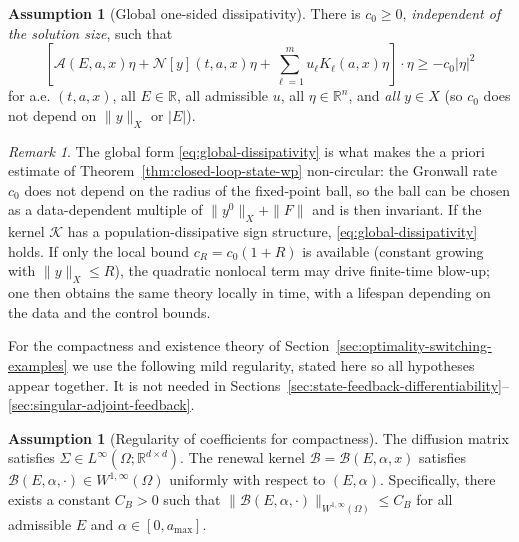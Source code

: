 \documentclass[pdflatex,sn-mathphys-num]{sn-jnl}
\theoremstyle{plain}
\theoremstyle{definition}
\newtheorem{assumption}[theorem]{Assumption}
\theoremstyle{remark}
\newtheorem{remark}[theorem]{Remark}
\newcommand{\R}{\mathbb R}
\begin{document}
\begin{assumption}[Global one-sided dissipativity]
\label{ass:dissipativity}
There is $c_0\ge0$, \emph{independent of the solution size}, such that
\begin{equation}
\label{eq:global-dissipativity}
\left[
\mathcal A(E,a,x)\eta
+
\mathcal N[y](t,a,x)\eta
+
\sum_{\ell=1}^m u_\ell K_\ell(a,x)\eta
\right]\cdot\eta
\ge
-c_0|\eta|^2
\end{equation}
for a.e. $(t,a,x)$, all $E\in\R$, all admissible $u$, all $\eta\in\R^n$, and
\emph{all} $y\in X$ (so $c_0$ does not depend on $\|y\|_X$ or $|E|$).
\end{assumption}

\begin{remark}
\label{rem:dissipativity-noncircular}
The global form \eqref{eq:global-dissipativity} is what makes the a priori
estimate of Theorem~\ref{thm:closed-loop-state-wp} non-circular: the Gronwall
rate $c_0$ does not depend on the radius of the fixed-point ball, so the ball
can be chosen as a data-dependent multiple of $\|y^0\|_X+\|F\|$ and is then
invariant. If the kernel $\mathscr K$ has a population-dissipative sign
structure, \eqref{eq:global-dissipativity} holds. If only the local bound
$c_{R}=c_0(1+R)$ is available (constant growing with $\|y\|_X\le R$), the
quadratic nonlocal term may drive finite-time blow-up; one then obtains the
same theory locally in time, with a lifespan depending on the data and the
control bounds.
\end{remark}

For the compactness and existence theory of
Section~\ref{sec:optimality-switching-examples} we use the following mild
regularity, stated here so all hypotheses appear together. It is not needed in
Sections~\ref{sec:state-feedback-differentiability}--\ref{sec:singular-adjoint-feedback}.

\begin{assumption}[Regularity of coefficients for compactness]
\label{ass:compactness-data}
The diffusion matrix satisfies \(\Sigma \in L^\infty(\Omega; \R^{d\times d})\). 
The renewal kernel \(\mathcal B = \mathcal B(E, \alpha, x)\) satisfies 
\(\mathcal B(E, \alpha, \cdot) \in W^{1,\infty}(\Omega)\) uniformly with respect to \((E, \alpha)\). 
Specifically, there exists a constant \(C_B > 0\) such that
$\|\mathcal B(E, \alpha, \cdot)\|_{W^{1,\infty}(\Omega)} \le C_B$
for all admissible \(E\) and \(\alpha \in [0, a_{\max}]\).
\end{assumption}

\end{document}
